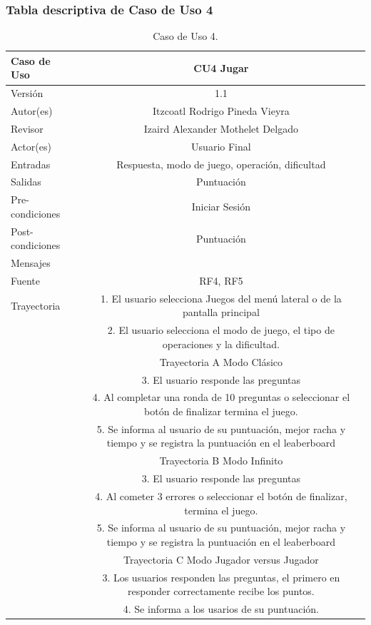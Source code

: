 \documentclass{article}
\begin{document}
\subsubsection{Tabla descriptiva de Caso de Uso 4}
\begin{table}[H]
\caption{Caso de Uso 4.}
\begin{tabular}{|M{5cm}|c|}
\hline
Caso de Uso & CU4 Jugar\\ \hline
Versión & 1.1\\ \hline
Autor(es) & Itzcoatl Rodrigo Pineda Vieyra\\ \hline
Revisor & Izaird Alexander Mothelet Delgado \\ \hline
Actor(es) & Usuario Final \\ \hline
Entradas &  Respuesta, modo de juego, operación, dificultad \\ \hline
Salidas & Puntuación \\ \hline
Pre-condiciones & Iniciar Sesión \\ \hline
Post-condiciones & Puntuación\\ \hline
Mensajes & \\
Fuente & RF4, RF5 \\ \hline	
	Trayectoria
		& 1.	El usuario selecciona Juegos del menú lateral o de la pantalla principal\\
		& 2. El usuario selecciona el modo de juego, el tipo de operaciones y la dificultad.\\
		& Trayectoria A Modo Clásico\\
		& 3.    El usuario responde  las preguntas \\
		& 4.	Al completar una ronda de 10 preguntas o seleccionar el botón de finalizar termina el juego.\\ 
		& 5. 	Se informa al usuario de su puntuación, mejor racha y tiempo y se registra la puntuación en el leaberboard\\ 
		& Trayectoria B Modo Infinito\\
		& 3.    El usuario responde  las preguntas \\
		& 4.  Al cometer 3 errores o seleccionar el botón de finalizar, termina el juego.\\ 
		& 5. 	Se informa al usuario de su puntuación, mejor racha y tiempo y se registra la puntuación en el leaberboard\\ 
		& Trayectoria C Modo Jugador versus Jugador\\
		& 3.    Los usuarios responden las preguntas, el primero en responder correctamente recibe los puntos. \\
		& 4. Se informa a los usarios de su puntuación.\\
		
		
		\hline
\end{tabular}
\end{table}
\end{document}
